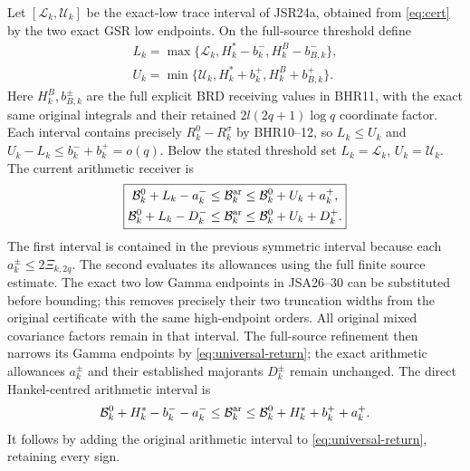 \documentclass[11pt,a4paper]{article}
\begin{document}
Let $[\mathscr L_k,\mathscr U_k]$ be the exact-low trace
interval of JSR24a, obtained from \eqref{eq:cert} by the two
exact GSR low endpoints. On the full-source threshold define
\begin{equation}
\begin{gathered}
 L_k=\max\{\mathscr L_k,H_k^*-b_k^-,H_k^B-b_{B,k}^-\},\\
 U_k=\min\{\mathscr U_k,H_k^*+b_k^+,H_k^B+b_{B,k}^+\}.
\end{gathered}
\end{equation}
Here $H_k^B,b_{B,k}^\pm$ are the full explicit BRD receiving
values in BHR11, with the exact same original integrals and
their retained $2l(2q+1)\log q$ coordinate factor. Each interval
contains precisely $R_k^0-R_k^\sigma$ by BHR10--12, so
$L_k\leq U_k$ and $U_k-L_k\leq b_k^-+b_k^+=o(q)$.
Below the stated threshold set
$L_k=\mathscr L_k$, $U_k=\mathscr U_k$.
The current arithmetic receiver is
\begin{equation}
 \boxed{\begin{aligned}
 \mathcal B_k^0+L_k-a_k^-&\le\mathcal B_k^{\rm ar}
                         \le\mathcal B_k^0+U_k+a_k^+,\\
 \mathcal B_k^0+L_k-D_k^-&\le\mathcal B_k^{\rm ar}
                         \le\mathcal B_k^0+U_k+D_k^+.
 \end{aligned}}\label{eq:arithmeticinterval}
\end{equation}
The first interval is contained in the previous symmetric interval
because each $a_k^\pm\le2\Xi_{k,2q}$. The second evaluates its
allowances using the full finite source estimate. The exact two low
Gamma endpoints in JSA26--30 can be substituted before bounding;
this removes precisely their two truncation widths from the original
certificate with the same high-endpoint orders. All original mixed covariance factors remain in that interval.
The full-source refinement then narrows its Gamma endpoints
by \eqref{eq:universal-return}; the exact arithmetic allowances
$a_k^\pm$ and their established majorants $D_k^\pm$ remain
unchanged. The direct Hankel-centred arithmetic interval is
\begin{equation}
 \mathcal B_k^0+H_k^*-b_k^--a_k^-
 \leq\mathcal B_k^{\rm ar}
 \leq\mathcal B_k^0+H_k^*+b_k^++a_k^+.
\end{equation}
It follows by adding the original arithmetic interval to
\eqref{eq:universal-return}, retaining every sign.
\end{document}
